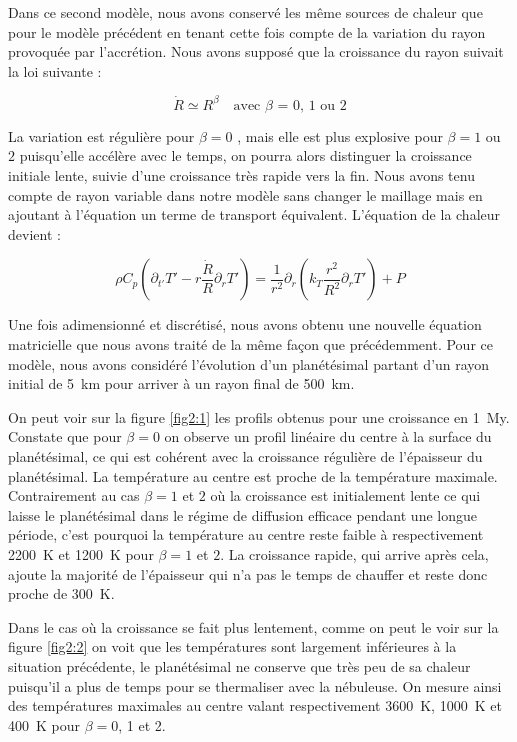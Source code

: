 \documentclass[10pt,a4paper]{article}
\numberwithin{equation}{section}
\begin{document}
Dans ce second modèle, nous avons conservé les même sources de chaleur que pour le modèle précédent en tenant cette fois compte de la variation du rayon provoquée par l'accrétion. Nous avons supposé que la croissance du rayon suivait la loi suivante :

\begin{equation}
\dot{R} \simeq R^\beta  \quad \textrm{avec $\beta$ = 0, 1 ou 2}
\end{equation}

La variation est régulière pour $\beta = 0$ , mais elle est plus explosive pour $\beta = 1$ ou $2$ puisqu'elle accélère avec le temps, on pourra alors distinguer la croissance initiale lente, suivie d'une croissance très rapide vers la fin. 
Nous avons tenu compte de rayon variable dans notre modèle sans changer le maillage mais en ajoutant à l'équation un terme de transport équivalent. L'équation de la chaleur devient :

\begin{equation}
\rho C_p (\partial_{t'} T' - r \frac{\dot{R}}{R}\partial_{r} T')= \frac{1}{r^2} \partial_{r} ( k_{T} \frac{r^2}{R^2} \partial_{r} T')  + P
\end{equation}

Une fois adimensionné et discrétisé, nous avons obtenu une nouvelle équation matricielle que nous avons traité de la même façon que précédemment.
Pour ce modèle, nous avons considéré l'évolution d'un planétésimal partant d'un rayon initial de \SI{5}{km} pour arriver à un rayon final de \SI{500}{km}. 

On peut voir sur la figure \ref{fig2:1} les profils obtenus pour une croissance en \SI{1}{My}. Constate que pour $\beta = 0$ on observe un profil linéaire du centre à la surface du planétésimal, ce qui est cohérent avec la croissance régulière de l'épaisseur du planétésimal. La température au centre est proche de la température maximale. Contrairement au cas $\beta = 1$ et $2$ où la croissance est initialement lente ce qui laisse le planétésimal dans le régime de diffusion efficace pendant une longue période, c'est pourquoi la température au centre reste faible à respectivement \SI{2200}{K} et \SI{1200}{K} pour $\beta = 1$ et $2$. La croissance rapide, qui arrive après cela, ajoute la majorité de l'épaisseur qui n'a pas le temps de chauffer et reste donc proche de \SI{300}{K}.

Dans le cas où la croissance se fait plus lentement, comme on peut le voir sur la figure \ref{fig2:2} on voit que les températures sont largement inférieures à la situation précédente, le planétésimal ne conserve que très peu de sa chaleur puisqu'il a plus de temps pour se thermaliser avec la nébuleuse. On mesure ainsi des températures maximales au centre valant respectivement \SI{3600}{K}, \SI{1000}{K} et \SI{400}{K} pour $\beta = 0$, 1 et 2.
\end{document}
